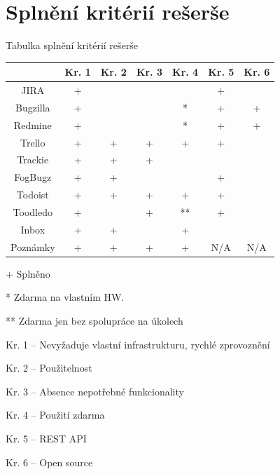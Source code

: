 \documentclass[thesis=B,czech]{FITthesis}[2012/06/26]
\newcommand{\crita}{Nevyžaduje vlastní infrastrukturu, rychlé zprovoznění}
\newcommand{\critb}{Použitelnost}
\newcommand{\critc}{Absence nepotřebné funkcionality}
\newcommand{\critd}{Použití zdarma}
\newcommand{\critf}{REST API}
\newcommand{\critg}{Open source}
\begin{document}
\chapter{Splnění kritérií rešerše}
	\begin{center}
	\begin{threeparttable}
		\caption{Tabulka splnění kritérií rešerše}
		\label{table:criteria}
		\begin{tabular}{|c||c|c|c|c|c|c|}
			\hline
			           & Kr. 1 & Kr. 2 & Kr. 3 & Kr. 4 & Kr. 5 & Kr. 6 \\ \hline
			JIRA       & +     & ~     & ~     & ~     & +     & ~     \\ \hline
			Bugzilla   & +     & ~     & ~     & *     & +     & +     \\ \hline
			Redmine    & +     & ~     & ~     & *     & +     & +     \\ \hline
			Trello     & +     & +     & +     & +     & +     & ~     \\ \hline
			Trackie    & +     & +     & +     & ~     & ~     & ~     \\ \hline
			FogBugz    & +     & +     & ~     & ~     & +     & ~     \\ \hline
			Todoist    & +     & +     & +     & +     & +     & ~     \\ \hline
			Toodledo   & +     & ~     & +     & **    & +     & ~     \\ \hline
			Inbox      & +     & +     & ~     & +     & ~     & ~     \\ \hline
			Poznámky   & +     & +     & +     & +     & N/A   & N/A   \\ \hline
			
		\end{tabular}
		
		\begin{tablenotes}
			\item[+] Splněno
			\item[*] Zdarma na vlastním HW.
			\item[**] Zdarma jen bez spolupráce na úkolech
			\item Kr. 1 -- \crita
			\item Kr. 2 -- \critb
			\item Kr. 3 -- \critc
			\item Kr. 4 -- \critd
			\item Kr. 5 -- \critf
			\item Kr. 6 -- \critg
		\end{tablenotes}
		
	\end{threeparttable}
	\end{center}
\end{document}
